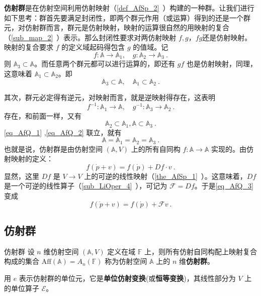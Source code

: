 
\textbf{仿射群}是在仿射空间利用仿射映射（\autoref{def_AfSp_2}~）构建的一种群。让我们进行如下思考：群首先要满足封闭性，即两个群元作用（或运算）得到的还是一个群元，对仿射群而言，群元是仿射映射，映射的运算很自然的用映射的复合（\autoref{sub_map_2}~）表示。那么封闭性要求对两仿射映射 $f,g$，$fg$还是仿射映射。映射的复合要求 $f$ 的定义域起码得包含 $g$ 的值域。记
 \begin{equation}
f:\mathbb A\rightarrow\mathbb A_1,\quad g:\mathbb A_2\rightarrow \mathbb A_3~.
 \end{equation}
 则 $\mathbb A_3\subset \mathbb A$。而任意两个群元都可以进行运算的，即还有 $gf$ 也是仿射映射，同理，这意味着 $\mathbb A_1\subset\mathbb A_2$。即
 \begin{equation}\label{eq_AfQ_1}
 \mathbb A_3\subset \mathbb A,\quad \mathbb A_1\subset\mathbb A_2~.
 \end{equation}
 

 其次，群元必定得有逆元，对映射而言，就是逆映射得存在，这表明
\begin{equation}
 f^{-1}:\mathbb A_1\rightarrow\mathbb A,\quad g^{-1}:\mathbb A_3\rightarrow\mathbb A_2~.
\end{equation}
 存在，和前面一样，又有
 \begin{equation}\label{eq_AfQ_2}
 \mathbb A_2\subset \mathbb A_1, \mathbb A\subset\mathbb A_3~.
 \end{equation}
 \autoref{eq_AfQ_1} ,\autoref{eq_AfQ_2} 联立，就有
 \begin{equation}
 \mathbb A=\mathbb A_1= \mathbb A_2=\mathbb A_3~.
 \end{equation}
 也就是说，仿射群是由仿射空间 $(\mathbb A,V)$ 上的所有自同构 $f:\mathbb A\rightarrow\mathbb A$ 实现的。由仿射映射的定义：
 \begin{equation}\label{eq_AfQ_3}
 f(\dot p+v)=f(\dot p)+Df\cdot v~.
 \end{equation}
 显然，这里 $Df$ 是 $V\rightarrow V$ 上的可逆的线性映射（\autoref{the_AfSp_1}~）。这意味着，$Df$ 是一个可逆的线性算子（\autoref{sub_LiOper_4}~），可记为 $\mathcal F=Df$。于是\autoref{eq_AfQ_3} 变成
 \begin{equation}
 f(\dot p+v)=f(\dot p)+\mathcal F v~.
 \end{equation}
 \subsection{仿射群}
 \begin{definition}{仿射群}
 设 $n$ 维仿射空间 $(\mathbb A,V)$ 定义在域 $\mathbb F$ 上，则所有仿射自同构配上映射复合构成的集合 $\mathrm{Aff}(\mathbb A)=A_n(\mathbb F)$ 称为仿射空间 $\mathbb A$ 上的 $n$ 维\textbf{仿射群}。
 \end{definition}
 用 $e$ 表示仿射群的单位元，它是\textbf{单位仿射变换}(或\textbf{恒等变换})，其线性部分为 $V$ 上的单位算子 $\mathcal E$。

